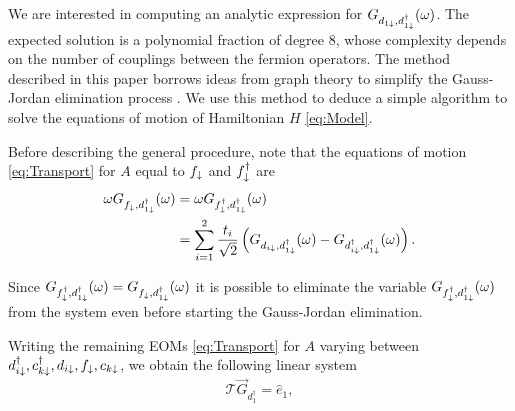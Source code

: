 \documentclass[showpacs,aps,prb,reprint,superscriptaddress]{revtex4-2}
\begin{document}
We are interested in computing an analytic expression for $G_{d_{1\downarrow},d^\dagger_{1\downarrow}}(\omega)$. The expected solution is a polynomial fraction of degree $8$, whose complexity depends on the number of couplings between the fermion operators. The method described in this paper borrows ideas from graph theory to simplify the Gauss-Jordan elimination process \citet{spielman_algorithms_2010}. We use this method to deduce a simple algorithm to solve the equations of motion of Hamiltonian $H$ \eqref{eq:Model}.  



Before describing the general procedure, note that  the equations of motion \eqref{eq:Transport} for $A$ equal to $f_\downarrow$ and $f^\dagger_\downarrow$ are  
\begin{align}
        \omega G_{f_{\downarrow},d_{1\downarrow}^{\dagger}}(\omega)&= \omega G_{f^\dagger_{\downarrow},d_{1\downarrow}^{\dagger}}(\omega) \\
        &= \sum_{i=1}^2 \frac{t_i}{\sqrt{2}}\left(G_{d_{i\downarrow},d_{1\downarrow}^{\dagger}}(\omega)-G_{d_{i\downarrow}^{\dagger},d_{1\downarrow}^{\dagger}}(\omega)\right). 
\end{align}

\noindent Since $G_{f_{\downarrow}^{\dagger},d_{1\downarrow}^{\dagger}}(\omega) = G_{f_{\downarrow},d_{1\downarrow}^{\dagger}}(\omega) $ it is possible to eliminate the variable $G_{f_{\downarrow}^{\dagger},d_{1\downarrow}^{\dagger}}(\omega) $ from the system even before starting the Gauss-Jordan elimination. 

Writing the remaining EOMs \eqref{eq:Transport} for $A$ varying between  $d^\dagger_{i\downarrow},c^\dagger_{k\downarrow}, d_{i\downarrow},f_\downarrow ,c_{k\downarrow}$,   we obtain the following linear system
\begin{equation}
    \mathcal{T} \vec{G}_{d^\dagger_1} = \hat{e}_1,
\end{equation}
\end{document}
